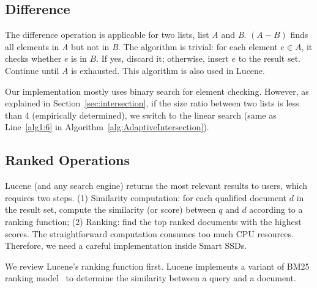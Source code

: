 
\subsection{Difference}\label{sec:difference}
The difference operation is applicable for two lists, list \emph{A} and \emph{B}. $(A-B)$ finds all elements in \emph{A} but not in \emph{B}. The algorithm is trivial: for each element $e\in A$, it checks whether $e$ is in $B$. If yes, discard it; otherwise, insert $e$ to the result set. Continue until $A$ is exhausted. This algorithm is also used in Lucene.

Our implementation mostly uses binary search for element checking. However, as explained in Section~\ref{sec:intersection}, if the size ratio between two lists is less than 4 (empirically determined), we switch to the linear search (same as Line~\ref{alg1:6} in Algorithm~\ref{alg:AdaptiveIntersection}).



\subsection{Ranked Operations}\label{sec:ranked}

Lucene (and any search engine) returns the most relevant results to users, which requires two steps. (1) Similarity computation: for each qualified document $d$ in the result set, compute the similarity (or score) between $q$ and $d$ according to a ranking function; (2) Ranking: find the top ranked documents with the highest scores. The straightforward computation consumes too much CPU resources. Therefore, we need a careful implementation inside Smart SSDs.

We review Lucene's ranking function first. Lucene implements a variant of BM25 ranking model~\cite{Robertson1994,Singhal01} to determine the similarity between a query and a document.

